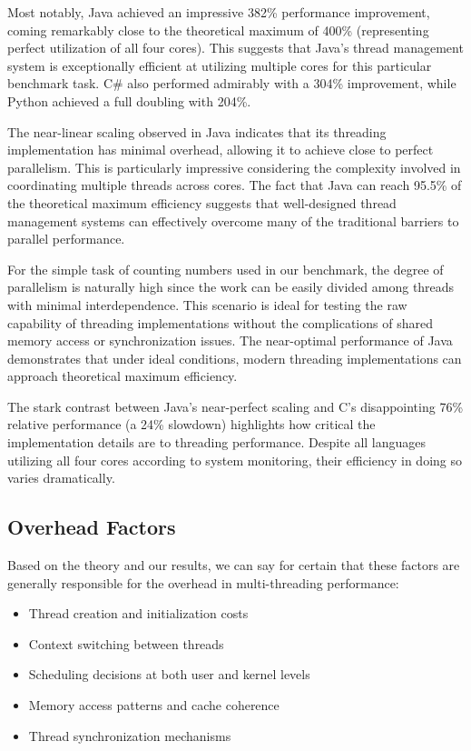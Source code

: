 \documentclass[12pt,a4paper]{article}
\begin{document}
Most notably, Java achieved an impressive 382\% performance improvement, coming remarkably close to the theoretical maximum of 400\% (representing perfect utilization of all four cores). This suggests that Java's thread management system is exceptionally efficient at utilizing multiple cores for this particular benchmark task. C\# also performed admirably with a 304\% improvement, while Python achieved a full doubling with 204\%.

The near-linear scaling observed in Java indicates that its threading implementation has minimal overhead, allowing it to achieve close to perfect parallelism. This is particularly impressive considering the complexity involved in coordinating multiple threads across cores. The fact that Java can reach 95.5\% of the theoretical maximum efficiency suggests that well-designed thread management systems can effectively overcome many of the traditional barriers to parallel performance.

For the simple task of counting numbers used in our benchmark, the degree of parallelism is naturally high since the work can be easily divided among threads with minimal interdependence. This scenario is ideal for testing the raw capability of threading implementations without the complications of shared memory access or synchronization issues. The near-optimal performance of Java demonstrates that under ideal conditions, modern threading implementations can approach theoretical maximum efficiency.

The stark contrast between Java's near-perfect scaling and C's disappointing 76\% relative performance (a 24\% slowdown) highlights how critical the implementation details are to threading performance. Despite all languages utilizing all four cores according to system monitoring, their efficiency in doing so varies dramatically.

\subsection{Overhead Factors}

Based on the theory and our results, we can say for certain that these factors are generally responsible for the overhead in multi-threading performance:
\begin{itemize}
    \item Thread creation and initialization costs
    \item Context switching between threads
    \item Scheduling decisions at both user and kernel levels
    \item Memory access patterns and cache coherence
    \item Thread synchronization mechanisms
\end{itemize}
\end{document}
